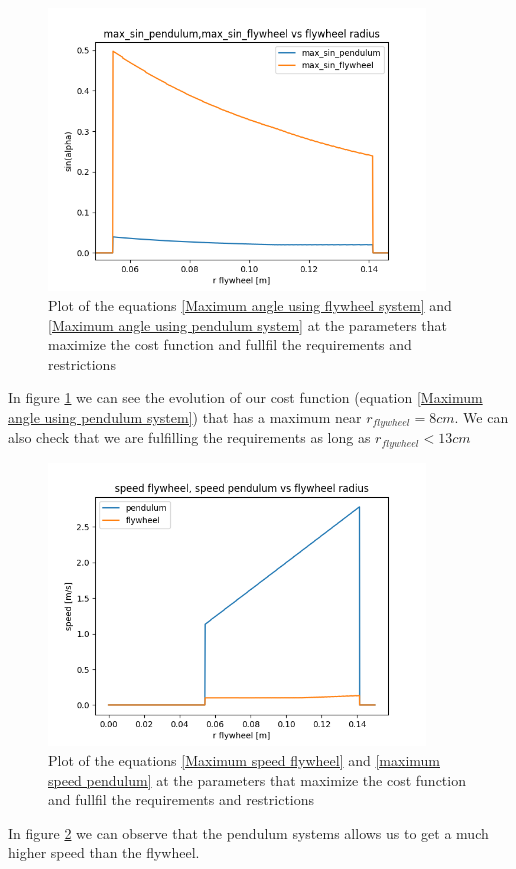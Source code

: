 \begin{figure}[H]
	\centering
	\includegraphics[width=10cm]{img/optimization/sin.png}
	\caption{Plot of the equations \ref{Maximum angle using flywheel system} and \ref{Maximum angle using pendulum system} at the parameters that maximize the cost function and fullfil the requirements and restrictions}
	\label{fig:Sinus plot}
\end{figure}
In figure \ref{fig:Sinus plot} we can see the evolution of our cost function (equation \ref{Maximum angle using pendulum system}) that has a maximum near $r_{flywheel} = 8cm$.
We can also check that we are fulfilling the requirements as long as $r_{flywheel}<13cm$ 

\begin{figure}[H]
	\centering
	\includegraphics[width=10cm]{img/optimization/speed.png}
	\caption{Plot of the equations \ref{Maximum speed flywheel} and \ref{maximum speed pendulum} at the parameters that maximize the cost function and fullfil the requirements and restrictions}
	\label{fig:Speed plot}
\end{figure}
In figure \ref{fig:Speed plot} we can observe that the pendulum systems allows us to get a much higher speed than the flywheel.


